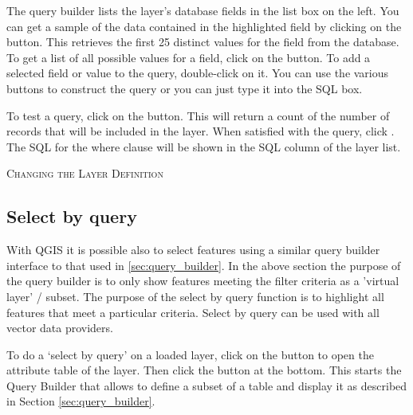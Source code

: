 The query builder lists the layer's database
fields in the list box on the left. You can get a sample of the data
contained in the highlighted field by clicking on the  button. This retrieves the first 25 distinct values
for the field from the database. To get a list of all possible values for a
field, click on the  button. To add a selected field or value to the query, double-click on
it. You can use the various buttons to
construct the query or you can just type it into the SQL box.

To test a query, click on the  button. This will return a count of the number of records that will be
included in the layer. When satisfied with the query, click . The
SQL for the where clause will be shown in the SQL column of the layer list.

\begin{Tip}\caption{\textsc{Changing the Layer Definition}}
\end{Tip}

\subsection{Select by query}\label{sec:select_by_query}

With QGIS it is possible also to select features using a similar query builder 
interface to that used in \ref{sec:query_builder}. In the above section 
the purpose of the query builder is to only show features meeting the 
filter criteria as a 'virtual layer' / subset. The purpose of the select by 
query function is to highlight all features that meet a particular criteria. 
Select by query can be used with all vector data providers.

To do a `select by query' on a loaded layer, click on the 
button  to open the attribute table of the layer. Then 
click the  button at the bottom. This starts the Query Builder 
that allows to define a subset of a table and display it as described in Section 
\ref{sec:query_builder}.


